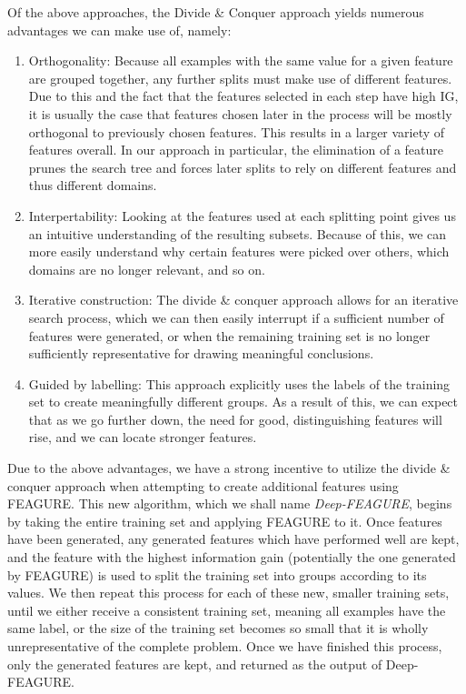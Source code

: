 \documentclass[twoside,11pt]{article}
\theoremstyle{definition}
\begin{document}
Of the above approaches, the Divide \& Conquer approach yields numerous advantages we can make use of, namely:
\begin{enumerate}
	\item Orthogonality: Because all examples with the same value for a given feature are grouped together, any further splits must make use of different features. Due to this and the fact that the features selected in each step have high IG, it is usually the case that features chosen later in the process will be mostly orthogonal to previously chosen features. This results in a larger variety of features overall. In our approach in particular, the elimination of a feature prunes the search tree and forces later splits to rely on different features and thus different domains.
	\item Interpertability: Looking at the features used at each splitting point gives us an intuitive understanding of the resulting subsets. Because of this, we can more easily understand why certain features were picked over others, which domains are no longer relevant, and so on.
	\item Iterative construction: The divide \& conquer approach allows for an iterative search process, which we can then easily interrupt if a sufficient number of features were generated, or when the remaining training set is no longer sufficiently representative for drawing meaningful conclusions.
	\item Guided by labelling: This approach explicitly uses the labels of the training set to create meaningfully different groups. As a result of this, we can expect that as we go further down, the need for good, distinguishing features will rise, and we can locate stronger features.
\end{enumerate}

Due to the above advantages, we have a strong incentive to utilize the divide \& conquer approach when attempting to create additional features using FEAGURE. This new algorithm, which we shall name \emph{Deep-FEAGURE}, begins by taking the entire training set and applying FEAGURE to it. Once features have been generated, any generated features which have performed well are kept, and the feature with the highest information gain (potentially the one generated by FEAGURE) is used to split the training set into groups according to its values.
We then repeat this process for each of these new, smaller training sets, until we either receive a consistent training set, meaning all examples have the same label, or the size of the training set becomes so small that it is wholly unrepresentative of the complete problem.
Once we have finished this process, only the generated features are kept, and returned as the output of Deep-FEAGURE.
\end{document}
